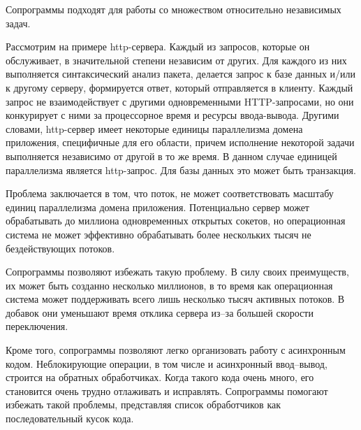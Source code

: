	Сопрограммы подходят для работы со множеством относительно независимых задач.
	\par
	Рассмотрим на примере http-сервера. Каждый из запросов, которые он обслуживает, в значительной
	степени независим от других. Для каждого из них выполняется синтаксический анализ пакета, делается
	запрос к базе данных и/или к другому серверу, формируется ответ, который отправляется в клиенту. 
	Каждый запрос не взаимодействует с другими одновременными HTTP-запросами, но они конкурирует с ними за процессорное время и ресурсы ввода-вывода.
	Другими словами, http-сервер имеет некоторые единицы параллелизма домена приложения, 
	специфичные для его области, причем исполнение некоторой задачи выполняется независимо от другой в
	то же время. В данном случае единицей параллелизма является http-запрос. Для базы данных это может
	быть транзакция.
	\par
	Проблема заключается в том, что поток, не может соответствовать масштабу единиц параллелизма домена приложения.
	Потенциально сервер может обрабатывать до миллиона
	одновременных открытых сокетов, но операционная система не может эффективно обрабатывать более нескольких
	тысяч не бездействующих потоков.
	\par
	Сопрограммы позволяют избежать такую проблему. В силу своих преимуществ, их может быть
	созданно несколько миллионов, в то время как операционная система может поддерживать всего 
	лишь несколько тысяч активных потоков. В добавок они уменьшают время отклика сервера из--за
	большей скорости переключения.
	\par
	Кроме того, сопрограммы позволяют легко организовать работу с асинхронным  кодом.
	Неблокирующие операции, в том числе и асинхронный ввод--вывод, строится на обратных обработчиках.
	Когда такого кода очень много, его становится очень трудно отлаживать и исправлять.
	Сопрограммы помогают избежать такой проблемы, представляя список обработчиков как
	последовательный кусок кода.
	
\clearpage